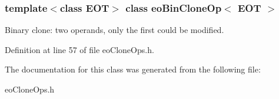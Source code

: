 \subsubsection*{template$<$class EOT$>$ class eo\-Bin\-Clone\-Op$<$ EOT $>$}

Binary clone: two operands, only the first could be modified. 



Definition at line 57 of file eo\-Clone\-Ops.h.

The documentation for this class was generated from the following file:\begin{CompactItemize}
\item 
eo\-Clone\-Ops.h\end{CompactItemize}
